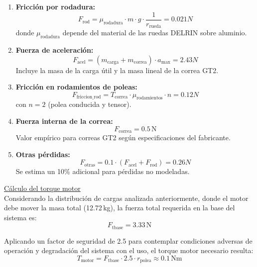 \begin{enumerate}
    \item \textbf{Fricción por rodadura:}
    \begin{equation}
    F_{\text{rod}} = \mu_{\text{rodadura}} \cdot m \cdot g \cdot \frac{1}{r_{\text{rueda}}}= 0.021N
    \end{equation}
    donde $\mu_{\text{rodadura}}$ depende del material de las ruedas DELRIN sobre aluminio.
    
    \item \textbf{Fuerza de aceleración:}
    \begin{equation}
    F_{\text{acel}} = (m_{\text{carga}} + m_{\text{correa}}) \cdot a_{\text{max}} = 2.43 N
    \end{equation}
    Incluye la masa de la carga útil y la masa lineal de la correa GT2.
    
    \item \textbf{Fricción en rodamientos de poleas:}
    \begin{equation}
    F_{\text{friccion\_rod}} = T_{\text{correa}} \cdot \mu_{\text{rodamientos}} \cdot n = 0.12N
    \end{equation}
    con $n = 2$ (polea conducida y tensor).
    
    \item \textbf{Fuerza interna de la correa:}
    \begin{equation}
    F_{\text{correa}} = 0.5\,\text{N}
    \end{equation}
    Valor empírico para correas GT2 según especificaciones del fabricante.
    
    \item \textbf{Otras pérdidas:}
    \begin{equation}
    F_{\text{otras}} = 0.1 \cdot (F_{\text{acel}} + F_{\text{rod}})=0.26N
    \end{equation}
    Se estima un 10\% adicional para pérdidas no modeladas.
\end{enumerate}

\underline{Cálculo del torque motor} \\
Considerando la distribución de cargas analizada anteriormente, donde el motor debe mover la masa total (12.72\,kg), la fuerza total requerida en la base del sistema es:
\begin{equation}
F_{\text{tbase}} = 3.33\,\text{N}
\end{equation}


Aplicando un factor de seguridad de 2.5 para contemplar condiciones adversas de operación y degradación del sistema con el uso, el torque motor necesario resulta:
\begin{equation}
T_{\text{motor}} = F_{\text{tbase}} \cdot 2.5 \cdot r_{\text{polea}} \approx 0.1\,\text{Nm}
\label{eq:torque_motor}
\end{equation}

